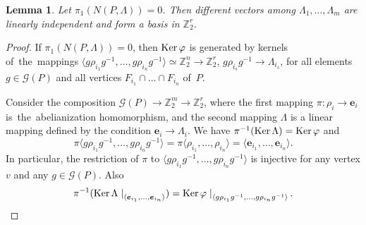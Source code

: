 \documentclass[12pt]{amsart}
\newtheorem{lemma}[formula]{Lemma}
\theoremstyle{definition}
\theoremstyle{remark}
\begin{document}
\begin{lemma}
Let $\pi_1(N(P,\Lambda))=0$. Then different vectors among $\Lambda_1,\dots,\Lambda_m$ are linearly independent and 
form a basis in $\mathbb Z_2^r$.
\end{lemma}
\begin{proof}
If $\pi_1(N(P,\Lambda))=0$, then ${{\rm Ker\,} \varphi}$ is generated by 
kernels of~the~mappings $\langle g\rho_{i_1}g^{-1},\dots, g\rho_{i_n}g^{-1}\rangle\simeq\mathbb Z_2^n\to\mathbb Z_2^r$, 
$g\rho_{i_s}g^{-1}\to \Lambda_{i_s}$, for all elements $g\in \mathcal{G}(P)$ and all vertices $F_{i_1}\cap\dots\cap F_{i_n}$ of~$P$.

Consider the composition $\mathcal{G}(P)\to\mathbb Z_2^m\to \mathbb Z_2^r$, where the first mapping 
$\pi\colon \rho_i\to \boldsymbol{e}_i$ is~the~abelianization homomorphism, and the second mapping $\Lambda$ 
is a linear mapping defined by the condition $\boldsymbol{e}_i\to\Lambda_i$. We have 
$\pi^{-1}({\rm Ker\,}\Lambda)={\rm Ker\,}\varphi$ and 
$$
\pi\langle g\rho_{i_1}g^{-1},\dots, g\rho_{i_n}g^{-1}\rangle=\pi\langle\rho_{i_1},\dots, \rho_{i_n}\rangle=
\langle \boldsymbol{e}_{i_1},\dots, \boldsymbol{e}_{i_n}\rangle.
$$
In particular, the restriction of $\pi$ to $\langle g\rho_{i_1}g^{-1},\dots, g\rho_{i_n}g^{-1}\rangle$ 
is injective for any vertex $v$ and any $g\in\mathcal{G}(P)$. Also 
$$
\pi^{-1}({\rm Ker}\,\Lambda\left.\right|_{\langle \boldsymbol{e}_{i_1},\dots, \boldsymbol{e}_{i_n}\rangle})={\rm Ker}\,\varphi\left.\right|_{\langle g\rho_{i_1}g^{-1},\dots, g\rho_{i_n}g^{-1}\rangle}.
$$ 


\end{proof}
\end{document}

